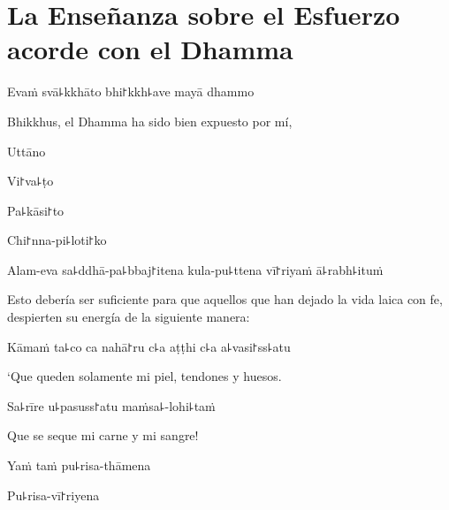 \chapter[Esfuerzo acorde con el Dhamma]{La Enseñanza sobre el Esfuerzo acorde con el Dhamma}



\begin{leader}
\end{leader}

Evaṁ svā꜕kkhāto bhi꜓kkh꜕ave mayā dhammo

\begin{english}
	Bhikkhus, el Dhamma ha sido bien expuesto por mí,
\end{english}

Uttāno


Vi꜓va꜕ṭo


Pa꜕kāsi꜓to


Chi꜓nna-pi꜕loti꜓ko


Alam-eva sa꜕ddhā-pa꜕bbaj꜓itena kula-pu꜕ttena vī꜓riyaṁ ā꜕rabh꜕ituṁ

\begin{english}
	Esto debería ser suficiente para que aquellos que han dejado la vida laica con fe, despierten su energía de la siguiente manera:
\end{english}

Kāmaṁ ta꜕co ca nahā꜓ru c꜕a aṭṭhi c꜕a a꜕vasi꜓ss꜕atu

\begin{english}
	`Que queden solamente mi piel, tendones y huesos.
\end{english}

Sa꜕rīre u꜕pasuss꜓atu maṁsa꜕-lohi꜕taṁ

\begin{english}
	Que se seque mi carne y mi sangre!
\end{english}

Yaṁ taṁ pu꜕risa-thāmena


Pu꜕risa-vī꜓riyena

